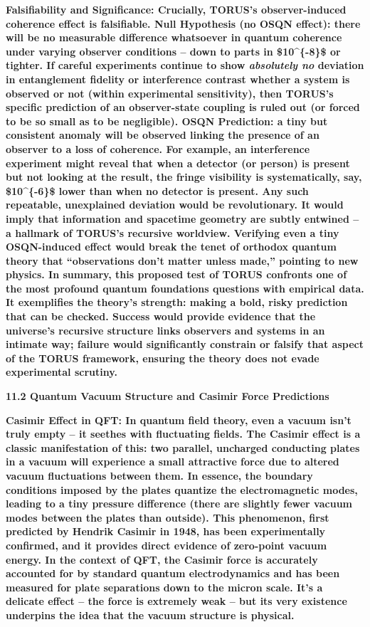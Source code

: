 \documentclass[
]{article}
\begin{document}
\textbf{Falsifiability and Significance: Crucially, TORUS's
observer-induced coherence effect is falsifiable. Null Hypothesis (no
OSQN effect): there will be no measurable difference whatsoever in
quantum coherence under varying observer conditions -- down to parts in
\$10\^{}\{-8\}\$ or tighter. If careful experiments continue to show
\emph{absolutely no} deviation in entanglement fidelity or interference
contrast whether a system is observed or not (within experimental
sensitivity), then TORUS's specific prediction of an observer-state
coupling is ruled out (or forced to be so small as to be negligible).
OSQN Prediction: a tiny but consistent anomaly will be observed linking
the presence of an observer to a loss of coherence. For example, an
interference experiment might reveal that when a detector (or person) is
present but not looking at the result, the fringe visibility is
systematically, say, \$10\^{}\{-6\}\$ lower than when no detector is
present. Any such repeatable, unexplained deviation would be
revolutionary. It would imply that information and spacetime geometry
are subtly entwined -- a hallmark of TORUS's recursive worldview.
Verifying even a tiny OSQN-induced effect would break the tenet of
orthodox quantum theory that ``observations don't matter unless made,''
pointing to new physics. In summary, this proposed test of TORUS
confronts one of the most profound quantum foundations questions with
empirical data. It exemplifies the theory's strength: making a bold,
risky prediction that can be checked. Success would provide evidence
that the universe's recursive structure links observers and systems in
an intimate way; failure would significantly constrain or falsify that
aspect of the TORUS framework, ensuring the theory does not evade
experimental scrutiny.}

\textbf{11.2 Quantum Vacuum Structure and Casimir Force Predictions}

\textbf{Casimir Effect in QFT: In quantum field theory, even a vacuum
isn't truly empty -- it seethes with fluctuating fields. The Casimir
effect is a classic manifestation of this: two parallel, uncharged
conducting plates in a vacuum will experience a small attractive force
due to altered vacuum fluctuations between them. In essence, the
boundary conditions imposed by the plates quantize the electromagnetic
modes, leading to a tiny pressure difference (there are slightly fewer
vacuum modes between the plates than outside). This phenomenon, first
predicted by Hendrik Casimir in 1948, has been experimentally confirmed,
and it provides direct evidence of zero-point vacuum energy. In the
context of QFT, the Casimir force is accurately accounted for by
standard quantum electrodynamics and has been measured for plate
separations down to the micron scale. It's a delicate effect -- the
force is extremely weak -- but its very existence underpins the idea
that the vacuum structure is physical.}
\end{document}
